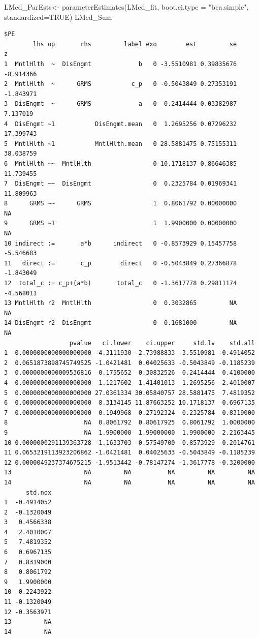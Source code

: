 \documentclass[
]{book}
\newenvironment{Shaded}{\begin{snugshade}}{\end{snugshade}}
\newcommand{\AttributeTok}[1]{\textcolor[rgb]{0.77,0.63,0.00}{#1}}
\newcommand{\ConstantTok}[1]{\textcolor[rgb]{0.00,0.00,0.00}{#1}}
\newcommand{\FunctionTok}[1]{\textcolor[rgb]{0.00,0.00,0.00}{#1}}
\newcommand{\NormalTok}[1]{#1}
\newcommand{\OtherTok}[1]{\textcolor[rgb]{0.56,0.35,0.01}{#1}}
\newcommand{\StringTok}[1]{\textcolor[rgb]{0.31,0.60,0.02}{#1}}
\begin{document}
\begin{Shaded}
\begin{Highlighting}[]
\NormalTok{LMed\_ParEsts}\OtherTok{\textless{}{-}} \FunctionTok{parameterEstimates}\NormalTok{(LMed\_fit, }\AttributeTok{boot.ci.type =} \StringTok{"bca.simple"}\NormalTok{, }\AttributeTok{standardized=}\ConstantTok{TRUE}\NormalTok{)}
\NormalTok{LMed\_Sum}
\end{Highlighting}
\end{Shaded}

\begin{verbatim}
$PE
        lhs op       rhs         label exo        est         se         z
1  MntlHlth  ~  DisEngmt             b   0 -3.5510981 0.39835676 -8.914366
2  MntlHlth  ~      GRMS           c_p   0 -0.5043849 0.27353191 -1.843971
3  DisEngmt  ~      GRMS             a   0  0.2414444 0.03382987  7.137019
4  DisEngmt ~1           DisEngmt.mean   0  1.2695256 0.07296232 17.399743
5  MntlHlth ~1           MntlHlth.mean   0 28.5881475 0.75155311 38.038759
6  MntlHlth ~~  MntlHlth                 0 10.1718137 0.86646385 11.739455
7  DisEngmt ~~  DisEngmt                 0  0.2325784 0.01969341 11.809963
8      GRMS ~~      GRMS                 1  0.8061792 0.00000000        NA
9      GRMS ~1                           1  1.9900000 0.00000000        NA
10 indirect :=       a*b      indirect   0 -0.8573929 0.15457758 -5.546683
11   direct :=       c_p        direct   0 -0.5043849 0.27366878 -1.843049
12  total_c := c_p+(a*b)       total_c   0 -1.3617778 0.29811174 -4.568011
13 MntlHlth r2  MntlHlth                 0  0.3032865         NA        NA
14 DisEngmt r2  DisEngmt                 0  0.1681000         NA        NA
                  pvalue   ci.lower    ci.upper     std.lv    std.all
1  0.0000000000000000000 -4.3111930 -2.73988833 -3.5510981 -0.4914052
2  0.0651873898745749525 -1.0421481  0.04025633 -0.5043849 -0.1185239
3  0.0000000000009536816  0.1755652  0.30832526  0.2414444  0.4100000
4  0.0000000000000000000  1.1217602  1.41401013  1.2695256  2.4010007
5  0.0000000000000000000 27.0361334 30.05840757 28.5881475  7.4819352
6  0.0000000000000000000  8.3134145 11.87663252 10.1718137  0.6967135
7  0.0000000000000000000  0.1949968  0.27192324  0.2325784  0.8319000
8                     NA  0.8061792  0.80617925  0.8061792  1.0000000
9                     NA  1.9900000  1.99000000  1.9900000  2.2163445
10 0.0000000291139363728 -1.1633703 -0.57549700 -0.8573929 -0.2014761
11 0.0653219113923206862 -1.0421481  0.04025633 -0.5043849 -0.1185239
12 0.0000049237374675215 -1.9513442 -0.78147274 -1.3617778 -0.3200000
13                    NA         NA          NA         NA         NA
14                    NA         NA          NA         NA         NA
      std.nox
1  -0.4914052
2  -0.1320049
3   0.4566338
4   2.4010007
5   7.4819352
6   0.6967135
7   0.8319000
8   0.8061792
9   1.9900000
10 -0.2243922
11 -0.1320049
12 -0.3563971
13         NA
14         NA
\end{verbatim}
\end{document}
